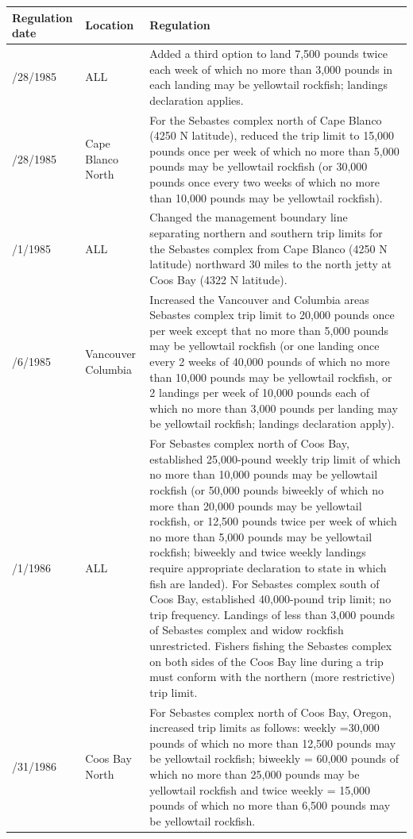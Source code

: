 \documentclass[12pt,]{article}
\begin{document}
\begin{tabular}{>{\centering}p{.60in}>{\centering}p{1.0in}>{\raggedright}p{4.20in}}
  \hline
Regulation date & Location & Regulation \\ 
  \hline
4/28/1985 & ALL & Added a third option to land 7,500 pounds twice each week of which no more than 3,000 pounds in each landing may be yellowtail rockfish; landings declaration applies. \\ 
  4/28/1985 & Cape Blanco North & For the Sebastes complex north of Cape Blanco (4250 N latitude), reduced the trip limit to 15,000 pounds once per week of which no more than 5,000 pounds may be yellowtail rockfish (or 30,000 pounds once every two weeks of which no more than 10,000 pounds may be yellowtail rockfish). \\ 
  9/1/1985 & ALL & Changed the management boundary line separating northern and southern trip limits for the Sebastes complex from Cape Blanco (4250 N latitude) northward 30 miles to the north jetty at Coos Bay (4322 N latitude). \\ 
  10/6/1985 & Vancouver Columbia & Increased the Vancouver and Columbia areas Sebastes complex trip limit to 20,000 pounds once per week except that no more than 5,000 pounds may be yellowtail rockfish (or one landing once every 2 weeks of 40,000 pounds of which no more than 10,000 pounds may be yellowtail rockfish, or 2 landings per week of 10,000 pounds each of which no more than 3,000 pounds per landing may be yellowtail rockfish; landings declaration apply).  \\ 
  1/1/1986 & ALL & For Sebastes complex north of Coos Bay, established 25,000-pound weekly trip limit of which no more than 10,000 pounds may be yellowtail rockfish (or 50,000 pounds biweekly of which no more than 20,000 pounds may be yellowtail rockfish, or 12,500 pounds twice per week of which no more than 5,000 pounds may be yellowtail rockfish; biweekly and twice weekly landings require appropriate declaration to state in which fish are landed). For Sebastes complex south of Coos Bay, established 40,000-pound trip limit; no trip frequency. Landings of less than 3,000 pounds of Sebastes complex and widow rockfish unrestricted. Fishers fishing the Sebastes complex on both sides of the Coos Bay line during a trip must conform with the northern (more restrictive) trip limit.  \\ 
  8/31/1986 & Coos Bay North & For Sebastes complex north of Coos Bay, Oregon, increased trip limits as follows: weekly =30,000 pounds of which no more than 12,500 pounds may be yellowtail rockfish; biweekly = 60,000 pounds of which no more than 25,000 pounds may be yellowtail rockfish and twice weekly = 15,000 pounds of which no more than 6,500 pounds may be yellowtail rockfish.  \\ 

\end{tabular}
\end{document}
